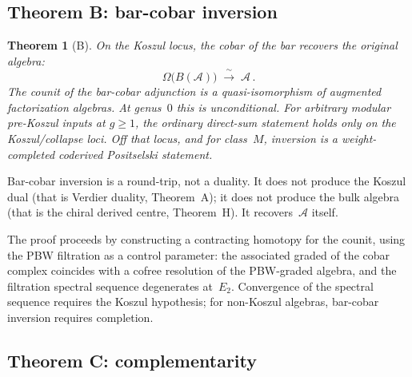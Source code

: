 \documentclass[11pt,reqno]{amsart}
\newtheorem{theorem}{Theorem}[section]
\theoremstyle{definition}
\theoremstyle{remark}
\newcommand{\cA}{\mathcal{A}}
\numberwithin{equation}{section}
\begin{document}
\subsection{Theorem B: bar-cobar inversion}
\label{ssec:thm-b}

\begin{theorem}[B]\label{thm:B}
On the Koszul locus, the cobar of the bar recovers the
original algebra:
\begin{equation}\label{eq:inversion}
\Omega\bigl(B(\cA)\bigr)
\;\xrightarrow{\;\sim\;}
\;\cA\,.
\end{equation}
The counit of the bar-cobar adjunction is a
quasi-isomorphism of augmented factorization algebras.
At genus~$0$ this is unconditional. For arbitrary
modular pre-Koszul inputs at $g \ge 1$, the ordinary direct-sum
statement holds only on the Koszul/collapse loci. Off that locus,
and for class~$M$, inversion is a weight-completed coderived
Positselski statement.
\end{theorem}

Bar-cobar inversion is a round-trip, not a duality.
It does not produce the Koszul dual (that is Verdier
duality, Theorem~A); it does not produce the bulk
algebra (that is the chiral derived centre, Theorem~H).
It recovers~$\cA$ itself.

The proof proceeds by constructing a contracting homotopy
for the counit, using the PBW filtration as a control
parameter: the associated graded of the cobar complex
coincides with a cofree resolution of the PBW-graded
algebra, and the filtration spectral sequence degenerates
at~$E_2$. Convergence of the spectral sequence requires
the Koszul hypothesis; for non-Koszul algebras, bar-cobar
inversion requires completion.

\subsection{Theorem C: complementarity}
\label{ssec:thm-c}
\end{document}
